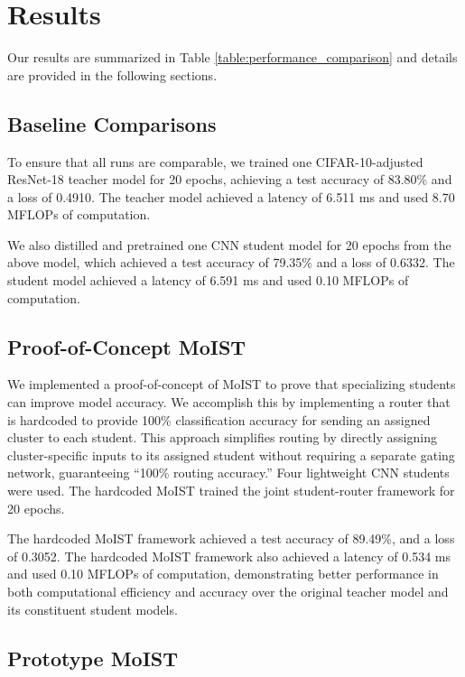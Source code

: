 \documentclass[conference]{IEEEtran}
\begin{document}
\section{Results}

Our results are summarized in Table \ref{table:performance_comparison} and details are provided in the following sections. 

\subsection{Baseline Comparisons}

To ensure that all runs are comparable, we trained one CIFAR-10-adjusted ResNet-18 teacher model for 20 epochs, achieving a test accuracy of 83.80\% and a loss of 0.4910. The teacher model achieved a latency of 6.511 ms and used 8.70 MFLOPs of computation.

We also distilled and pretrained one CNN student model for 20 epochs from the above model, which achieved a test accuracy of 79.35\% and a loss of 0.6332. The student model achieved a latency of 6.591 ms and used 0.10 MFLOPs of computation.

\subsection{Proof-of-Concept MoIST}

We implemented a proof-of-concept of MoIST to prove that specializing students can improve model accuracy. We accomplish this by implementing a router that is hardcoded to provide 100\% classification accuracy for sending an assigned cluster to each student. This approach simplifies routing by directly assigning cluster-specific inputs to its assigned student without requiring a separate gating network, guaranteeing ``100\% routing accuracy.'' Four lightweight CNN students were used. The hardcoded MoIST trained the joint student-router framework for 20 epochs.

The hardcoded MoIST framework achieved a test accuracy of 89.49\%, and a loss of 0.3052. The hardcoded MoIST framework also achieved a latency of 0.534 ms and used 0.10 MFLOPs of computation, demonstrating better performance in both computational efficiency and accuracy over the original teacher model and its constituent student models.

\subsection{Prototype MoIST}
\end{document}
